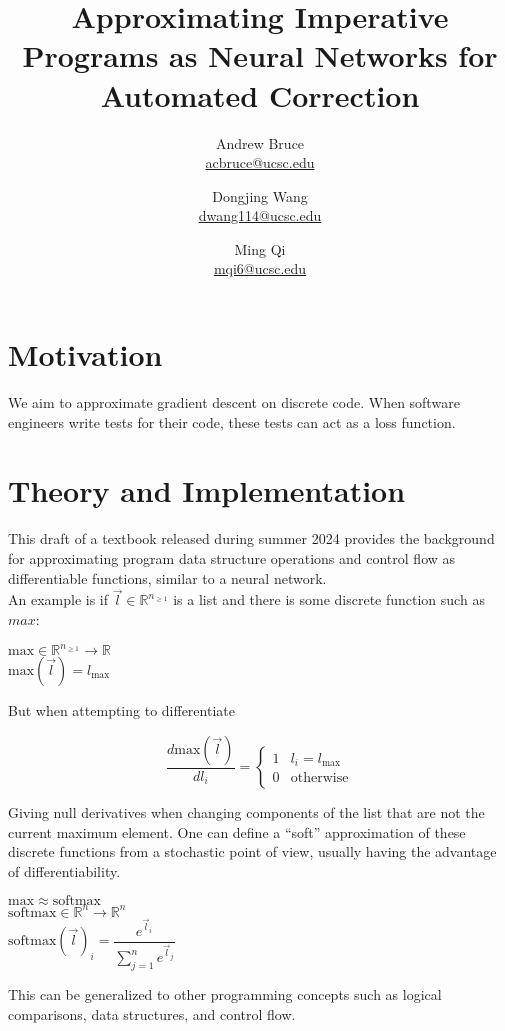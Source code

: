 \documentclass{article}
\title{Approximating Imperative Programs as Neural Networks for Automated Correction}
\author{Andrew Bruce \\ \href{mailto:acbruce@ucsc.edu}{acbruce@ucsc.edu}
  \and Dongjing Wang \\ \href{mailto:dwang114@ucsc.edu}{dwang114@ucsc.edu}
  \and Ming Qi \\ \href{mailto:mqi6@ucsc.edu}{mqi6@ucsc.edu} }
\begin{document}
\maketitle
\section*{Motivation}
We aim to approximate gradient descent on discrete code. When software engineers write tests for their code, these tests can act as a loss function.
\section*{Theory and Implementation}
This draft of a textbook \cite{blondel2024elementsdifferentiableprogramming} released during summer 2024 provides the background for approximating program data structure operations and control flow as differentiable functions, similar to a neural network.\\
An example is if $\vec{l} \in \mathbb{R}^{n_{\ge 1}}$ is a list and there is some discrete function such as $max$:
\begin{center}
  $\mathrm{max} \in \mathbb{R}^{n_{\ge 1}} \rightarrow \mathbb{R}$\\
  $\mathrm{max}(\vec{l}) = l_{\mathrm{max}}$
\end{center}
But when attempting to differentiate
\begin{center}
  $$\dfrac{d \mathrm{max}(\vec{l})}{dl_i} = \left\{
  \begin{array}{ll}
    1 & l_i = l_{\mathrm{max}} \\
    0 & \mathrm{otherwise}
  \end{array} 
  \right.$$
\end{center}
Giving null derivatives when changing components of the list that are not the current maximum element.
One can define a ``soft'' approximation of these discrete functions from a stochastic point of view, usually having the advantage of differentiability.
\begin{center}
  $\mathrm{max} \approx \mathrm{softmax}$\\
  $\mathrm{softmax} \in \mathbb{R}^n \rightarrow \mathbb{R}^n$\\
  $\mathrm{softmax}(\vec{l})_i = \dfrac{e^{\vec{l}_i}}{\sum_{j=1}^n e^{\vec{l}_j}}$\\
\end{center}
This can be generalized to other programming concepts such as logical comparisons, data structures, and control flow.
\end{document}
